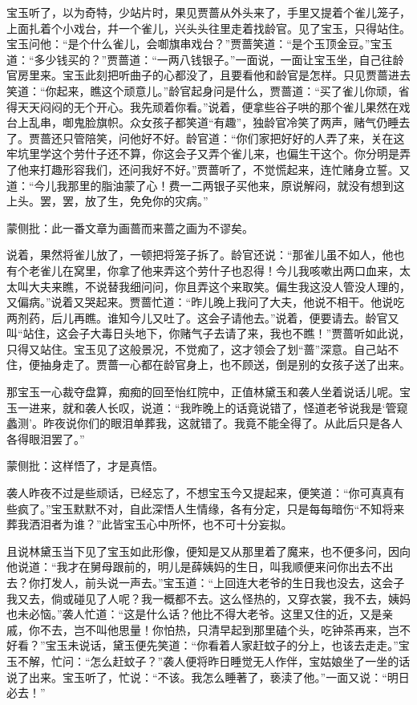 \begin{parag}
    宝玉听了，以为奇特，少站片时，果见贾蔷从外头来了，手里又提着个雀儿笼子，上面扎着个小戏台，幷一个雀儿，兴头头往里走着找龄官。见了宝玉，只得站住。宝玉问他：“是个什么雀儿，会啣旗串戏台？”贾蔷笑道：“是个玉顶金豆。”宝玉道：“多少钱买的？”贾蔷道：“一两八钱银子。”一面说，一面让宝玉坐，自己往龄官房里来。宝玉此刻把听曲子的心都没了，且要看他和龄官是怎样。只见贾蔷进去笑道：“你起来，瞧这个顽意儿。”龄官起身问是什么，贾蔷道：“买了雀儿你顽，省得天天闷闷的无个开心。我先顽着你看。”说着，便拿些谷子哄的那个雀儿果然在戏台上乱串，啣鬼脸旗帜。众女孩子都笑道“有趣”，独龄官冷笑了两声，赌气仍睡去了。贾蔷还只管陪笑，问他好不好。龄官道：“你们家把好好的人弄了来，关在这牢坑里学这个劳什子还不算，你这会子又弄个雀儿来，也偏生干这个。你分明是弄了他来打趣形容我们，还问我好不好。”贾蔷听了，不觉慌起来，连忙赌身立誓。又道：“今儿我那里的脂油蒙了心！费一二两银子买他来，原说解闷，就没有想到这上头。罢，罢，放了生，免免你的灾病。”\begin{note}蒙侧批：此一番文章为画蔷而来蔷之画为不谬矣。\end{note}说着，果然将雀儿放了，一顿把将笼子拆了。龄官还说：“那雀儿虽不如人，他也有个老雀儿在窝里，你拿了他来弄这个劳什子也忍得！今儿我咳嗽出两口血来，太太叫大夫来瞧，不说替我细问问，你且弄这个来取笑。偏生我这没人管没人理的，又偏病。”说着又哭起来。贾蔷忙道：“昨儿晚上我问了大夫，他说不相干。他说吃两剂药，后儿再瞧。谁知今儿又吐了。这会子请他去。”说着，便要请去。龄官又叫“站住，这会子大毒日头地下，你赌气子去请了来，我也不瞧！”贾蔷听如此说，只得又站住。宝玉见了这般景况，不觉痴了，这才领会了划“蔷”深意。自己站不住，便抽身走了。贾蔷一心都在龄官身上，也不顾送，倒是别的女孩子送了出来。
\end{parag}


\begin{parag}
    那宝玉一心裁夺盘算，痴痴的回至怡红院中，正值林黛玉和袭人坐着说话儿呢。宝玉一进来，就和袭人长叹，说道：“我昨晚上的话竟说错了，怪道老爷说我是‘管窥蠡测’。昨夜说你们的眼泪单葬我，这就错了。我竟不能全得了。从此后只是各人各得眼泪罢了。”\begin{note}蒙侧批：这样悟了，才是真悟。\end{note}袭人昨夜不过是些顽话，已经忘了，不想宝玉今又提起来，便笑道：“你可真真有些疯了。”宝玉默默不对，自此深悟人生情缘，各有分定，只是每每暗伤“不知将来葬我洒泪者为谁？”此皆宝玉心中所怀，也不可十分妄拟。
\end{parag}


\begin{parag}
    且说林黛玉当下见了宝玉如此形像，便知是又从那里着了魔来，也不便多问，因向他说道：“我才在舅母跟前的，明儿是薛姨妈的生日，叫我顺便来问你出去不出去？你打发人，前头说一声去。”宝玉道：“上回连大老爷的生日我也没去，这会子我又去，倘或碰见了人呢？我一概都不去。这么怪热的，又穿衣裳，我不去，姨妈也未必恼。”袭人忙道：“这是什么话？他比不得大老爷。这里又住的近，又是亲戚，你不去，岂不叫他思量！你怕热，只清早起到那里磕个头，吃钟茶再来，岂不好看？”宝玉未说话，黛玉便先笑道：“你看着人家赶蚊子的分上，也该去走走。”宝玉不解，忙问：“怎么赶蚊子？”袭人便将昨日睡觉无人作伴，宝姑娘坐了一坐的话说了出来。宝玉听了，忙说：“不该。我怎么睡著了，亵渎了他。”一面又说：“明日必去！”
\end{parag}



